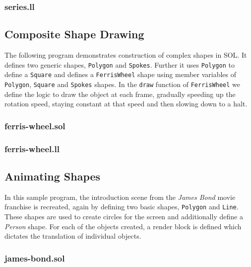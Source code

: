 \documentclass[letterpaper,12pt]{report}
\begin{document}
    \subsubsection{series.ll}
    

    \subsection{Composite Shape Drawing}
    The following program demonstrates construction of complex shapes in SOL. It defines two generic shapes, \texttt{Polygon} and \texttt{Spokes}. Further it uses \texttt{Polygon} to define a \texttt{Square} and defines a \texttt{FerrisWheel} shape using member variables of \texttt{Polygon}, \texttt{Square} and \texttt{Spokes} shapes. In the \texttt{draw} function of \texttt{FerrisWheel} we define the logic to draw the object at each frame, gradually speeding up the rotation speed, staying constant at that speed and then slowing down to a halt.

    \subsubsection{ferris-wheel.sol}
    

    \subsubsection{ferris-wheel.ll}
    

    \subsection{Animating Shapes}
    In this sample program, the introduction scene from the \textit{James Bond} movie franchise is recreated, again by defining two basic shapes, \texttt{Polygon} and \texttt{Line}. These shapes are used to create circles for the screen and additionally define a \textit{Person} shape. For each of the objects created, a render block is defined which dictates the translation of individual objects.

    \subsubsection{james-bond.sol}
    
\end{document}
